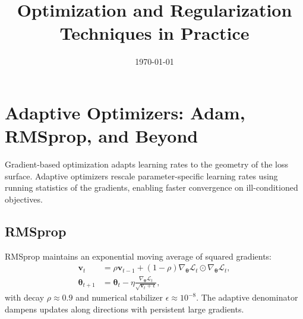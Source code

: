 \documentclass{article}
\title{Optimization and Regularization Techniques in Practice}
\author{}
\date{\today}
\begin{document}
\maketitle
\tableofcontents
\FloatBarrier

\section{Adaptive Optimizers: Adam, RMSprop, and Beyond}
Gradient-based optimization adapts learning rates to the geometry of the loss surface. Adaptive optimizers rescale parameter-specific learning rates using running statistics of the gradients, enabling faster convergence on ill-conditioned objectives.

\subsection{RMSprop}
RMSprop maintains an exponential moving average of squared gradients:
\begin{align}
  \mathbf{v}_t &= \rho \mathbf{v}_{t-1} + (1-\rho) \nabla_{\boldsymbol{\theta}} \mathcal{L}_t \odot \nabla_{\boldsymbol{\theta}} \mathcal{L}_t, \\
  \boldsymbol{\theta}_{t+1} &= \boldsymbol{\theta}_t - \eta \frac{\nabla_{\boldsymbol{\theta}} \mathcal{L}_t}{\sqrt{\mathbf{v}_t + \epsilon}},
\end{align}
with decay $\rho \approx 0.9$ and numerical stabilizer $\epsilon \approx 10^{-8}$. The adaptive denominator dampens updates along directions with persistent large gradients.
\end{document}
